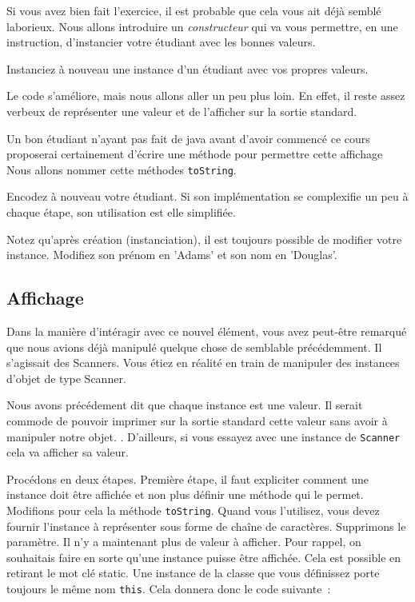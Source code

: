 \documentclass[a4paper,11pt]{article}
\begin{document}
	Si vous avez bien fait l'exercice, il est probable que cela vous ait déjà semblé laborieux. Nous allons introduire un \emph{constructeur} qui va vous permettre, en une instruction, d'instancier votre étudiant avec les bonnes valeurs.


	Instanciez à nouveau une instance d'un étudiant avec vos propres valeurs.

	Le code s'améliore, mais nous allons aller un peu plus loin. En effet, il reste assez verbeux de représenter une valeur et de l'afficher sur la sortie standard.

	Un bon étudiant n'ayant pas fait de java avant d'avoir commencé ce cours proposerai certainement d'écrire une méthode pour permettre cette affichage Nous allons nommer cette méthodes \texttt{toString}.


	Encodez à nouveau votre étudiant. Si son implémentation se complexifie un peu à chaque étape, son utilisation est elle simplifiée.

	Notez qu'après création (instanciation), il est toujours possible de modifier votre instance. Modifiez son prénom en 'Adams' et son nom en 'Douglas'.


	\subsection{Affichage}

	Dans la manière d'intéragir avec ce nouvel élément, vous avez peut-être remarqué que nous avions déjà manipulé quelque chose de semblable précédemment. Il s'agissait des Scanners. Vous étiez en réalité en train de manipuler des instances d'objet de type Scanner.

	Nous avons précédement dit que chaque instance est une valeur. Il serait commode de pouvoir imprimer sur la sortie standard cette valeur sans avoir à manipuler notre objet. . D'ailleurs, si vous essayez avec une instance de \texttt{Scanner} cela va afficher sa valeur.

	Procédons en deux étapes.
	Première étape, il faut expliciter comment une instance doit être affichée et non plus définir une méthode qui le permet. Modifions pour cela la méthode \texttt{toString}. Quand vous l'utilisez, vous devez fournir l'instance à représenter sous forme de chaîne de caractères. Supprimons le paramètre. Il n'y a maintenant plus de valeur à afficher. Pour rappel, on souhaitais faire en sorte qu'une instance puisse être affichée. Cela est possible en retirant le mot clé static. Une instance de la classe que vous définissez porte toujours le même nom \texttt{this}. Cela donnera donc le code suivante~:
\end{document}
